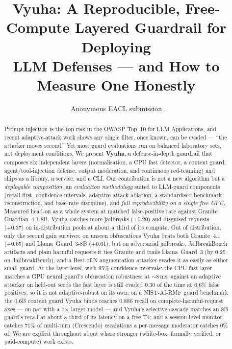 \documentclass[11pt]{article}
\title{Vyuha: A Reproducible, Free-Compute Layered Guardrail for Deploying\\
LLM Defenses --- and How to Measure One Honestly}
\author{Anonymous EACL submission}
\begin{document}
\maketitle

\begin{abstract}
Prompt injection is the top risk in the OWASP Top~10 for LLM Applications, and recent
adaptive-attack work shows any single filter, once known, can be evaded --- ``the attacker moves
second.'' Yet most guard evaluations run on balanced laboratory sets, not deployment conditions.
We present \textbf{Vyuha}, a defense-in-depth guardrail that composes six independent layers
(normalisation, a CPU fast detector, a content guard, agent/tool-injection defense, output
moderation, and continuous red-teaming) and ships as a library, a service, and a CLI. Our
contribution is not a new algorithm but a \emph{deployable composition}, an
\emph{evaluation methodology} suited to LLM-guard components (recall-first, confidence intervals,
adaptive-attack ablation, a standardised-benchmark reconstruction, and base-rate discipline), and
\emph{full reproducibility on a single free GPU}. Measured head-on as a whole system at matched false-positive rate against Granite Guardian~4.1-8B,
Vyuha catches more jailbreaks (+0.20) and disguised requests (+0.37) on in-distribution pools at about a
third of its compute. Out of distribution, only the second gain survives: on unseen obfuscations Vyuha
beats both Granite~4.1 (+0.65) and Llama~Guard~3-8B (+0.61), but on adversarial jailbreaks, JailbreakBench artifacts and plain harmful
requests it ties Granite and trails Llama~Guard~3 (by 0.25 on JailbreakBench), and a Best-of-N augmentation attacker evades it as
easily as either small guard. At the layer level, with 95\%
confidence intervals: the CPU fast layer matches a GPU neural guard's obfuscation robustness at
$\sim$8\,ms; against an adaptive attacker on held-out seeds the fast layer is still evaded 0.30 of the time at
6.6\% false positives, so it is not adaptive-robust on its own; on a NIST-AI-RMF guard benchmark the
0.6B content guard Vyuha binds reaches 0.886 recall on complete-harmful-request axes --- on par with a
7$\times$ larger model --- and Vyuha's selective cascade matches an 8B guard's recall at about a third
of its latency on a free T4; and a session-level monitor catches 71\% of multi-turn (Crescendo) escalations a
per-message moderator catches 0\% of. We are explicit throughout about where stronger
(white-box, formally verified, or paid-compute) work exists.
\end{abstract}
\end{document}
